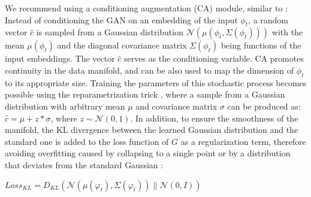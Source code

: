 \documentclass{article}
\begin{document}
We recommend using a conditioning augmentation (CA) module, similar to \cite{stackgan}: Instead of conditioning the GAN on an embedding of the input $\phi_t$, a random vector $\hat{c}$ is sampled from a Gaussian distribution $\mathcal{N}(\mu(\phi_t,\Sigma(\phi_t)))$ with the mean $\mu(\phi_t)$ and the diagonal covariance matrix $\Sigma (\phi_t)$ being functions of the input embeddings. 
The vector $\hat{c}$ serves as the conditioning variable. CA promotes continuity in the data manifold, and can be also used to map the dimension of $\phi_{t}$ to its appropriate size. Training the parameters of this stochastic process becomes possible using the reparametrization trick \cite{kingma2014autoencoding}, where a sample 
from a Gaussian distribution with arbitrary mean $\mu$ 
and covariance matrix $\sigma$  can be produced as: $\hat{c} = \mu + z * \sigma$, where $z\sim\mathcal{N} (0,1)$. In addition, 
to ensure the smoothness of the manifold, the KL divergence between the 
learned Gaussian distribution and the standard one is added to the loss function of $G$ as a regularization term, therefore avoiding overfitting caused by collapsing to a  single point or by a distribution that deviates from the standard Gaussian \cite{stackgan}:

\begin{center}
    $Loss_{KL} = D_{KL}(\mathcal{N}(\mu(\varphi_t), \Sigma(\varphi_t)) \| \mathcal{N}(0, I))$
\end{center}
\end{document}
